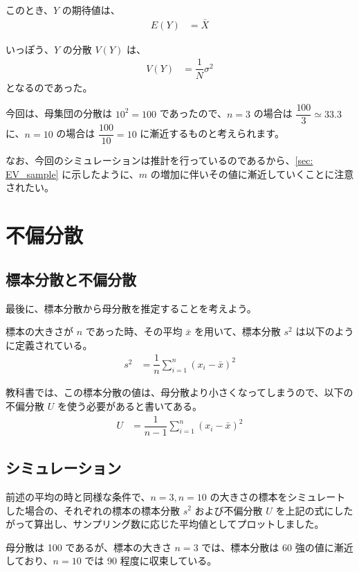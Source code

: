 \documentclass[uplatex,11pt,a4paper]{jsarticle}
\begin{document}
このとき、$Y$ の期待値は、
\begin{align*}
E(Y)
	&= \bar{X}
\end{align*}

いっぽう、$Y$ の分散 $V(Y)$ は、
\begin{align*}
V(Y)
	&= \dfrac{1}{N} \sigma^2
\end{align*}
となるのであった。

今回は、母集団の分散は $10^2=100$ であったので、$n=3$ の場合は $\dfrac{100}{3} \simeq 33.3$ に、$n=10$ の場合は $\dfrac{100}{10} = 10$ に漸近するものと考えられます。

なお、今回のシミュレーションは推計を行っているのであるから、\ref{sec: EV_sample} に示したように、$m$ の増加に伴いその値に漸近していくことに注意されたい。

\newpage

\section{不偏分散}

\subsection{標本分散と不偏分散}

最後に、標本分散から母分散を推定することを考えよう。

標本の大きさが $n$ であった時、その平均 $\bar{x}$ を用いて、標本分散 $s^2$ は以下のように定義されている。
\begin{align*}
s^2
	&=\dfrac{1}{n} \sum_{i=1}^n (x_i-\bar{x})^2
\end{align*}

教科書では、この標本分散の値は、母分散より小さくなってしまうので、以下の不偏分散 $U$ を使う必要があると書いてある。
\begin{align*}
U
	&=\dfrac{1}{n-1} \sum_{i=1}^n (x_i-\bar{x})^2
\end{align*}

\subsection{シミュレーション}

前述の平均の時と同様な条件で、$n=3, n=10$ の大きさの標本をシミュレートした場合の、それぞれの標本の標本分散 $s^2$ および不偏分散 $U$ を上記の式にしたがって算出し、サンプリング数に応じた平均値としてプロットしました。

母分散は 100 であるが、標本の大きさ $n=3$ では、標本分散は 60 強の値に漸近しており、$n=10$ では 90 程度に収束している。
\end{document}
